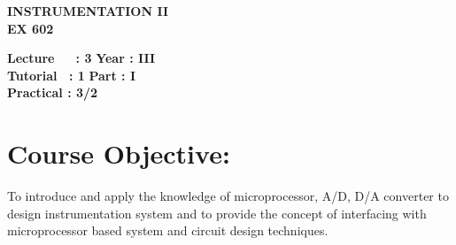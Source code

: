 \begin{center}
    \textbf{\huge{\uppercase{Instrumentation II}}}
    \\
    \vspace{.5cm}
    \textbf{\large{EX 602}}
\end{center}

\noindent\textbf{Lecture\ \ \ : 3} \hfill \textbf{Year : III} \\
\textbf{Tutorial \ : 1} \hfill \textbf{Part : I } \\
\textbf{Practical : 3/2}  \\

\par
\noindent 
\section*{Course Objective:}
To introduce and apply the knowledge of microprocessor, A/D, D/A converter to design instrumentation system and to provide the concept of interfacing with microprocessor based system and circuit design techniques.

